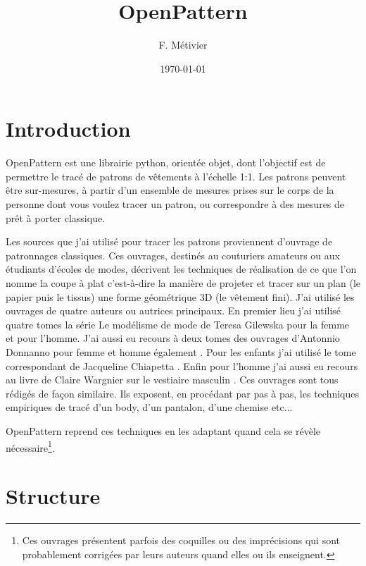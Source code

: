 \documentclass[11pt,a4paper]{report}
\begin{document}
\title{OpenPattern}
\author{F. Métivier}
\date{\today}
\maketitle

\tableofcontents


\chapter{Introduction}

OpenPattern  est une librairie python, orientée objet,  dont l'objectif est de permettre le tracé de patrons de vêtements à l'échelle 1:1.
Les patrons peuvent être sur-mesures, à  partir d'un ensemble de mesures prises sur le corps de la personne dont vous voulez tracer un patron, ou correspondre à des mesures de prêt à porter classique.

Les sources que j'ai utilisé pour tracer les patrons proviennent d'ouvrage de patronnages classiques. Ces ouvrages, destinés au couturiers amateurs ou aux étudiants d'écoles de modes, décrivent les techniques de réalisation de ce que l'on nomme la coupe à plat c'est-à-dire  la manière de projeter et tracer sur un plan (le papier puis le tissus) une forme géométrique 3D (le vêtement fini). J'ai utilisé les ouvrages de quatre auteurs ou autrices principaux.
En premier lieu j'ai utilisé quatre tomes la série Le modélisme de mode de Teresa Gilewska pour la femme et pour l'homme\cite{Gilewska1,Gilewska2,Gilewska4,Gilewska5}. J'ai aussi eu recours à deux tomes des ouvrages d'Antonnio Donnanno pour femme et homme également \cite{Donnanno2005,Donnanno2016}. Pour les enfants j'ai utilisé le tome correspondant de Jacqueline Chiapetta  \cite{Chiappetta1999}. Enfin pour l'homme j'ai aussi eu recours au livre de  Claire Wargnier sur le vestiaire masculin \cite{wargnier2012}. Ces ouvrages sont tous rédigés de façon similaire. Ils exposent, en procédant par pas à pas, les techniques empiriques de tracé d'un body, d'un pantalon, d'une chemise etc...

OpenPattern reprend ces techniques en les adaptant quand cela se révèle nécessaire\footnote{Ces ouvrages présentent parfois des coquilles ou des imprécisions qui  sont probablement corrigées par leurs auteurs quand elles ou ils enseignent.}.

\chapter{Structure}
\end{document}
